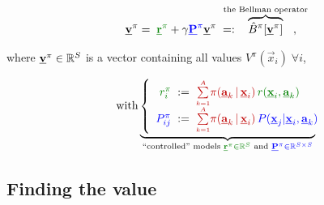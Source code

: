 \begin{frame}
	
	
\end{frame}

\begin{frame}

	
	\begin{equation}
		\vec v^\pi
		= \; {\color{reward}\vec r^\pi} 
			+ \gamma {\color{trans}\vec P^\pi} \vec v^\pi \; =: \kern-3ex\overbrace{\hat B^\pi[\vec v^\pi]}^{\text{the Bellman operator}}\kern-3ex,
	\end{equation}
	
	where $\underline{\mathbf{v}}^\pi \in \mathbb{R}^S$ is a vector containing all values $V^\pi(\vec x_{i})\;\forall i$,
	
	\begin{align}
		\quad \text{with}  \underbrace{ \left\{ \begin{array}{rcl} 
				{\color{reward}r^\pi_i} &\kern-1ex:=\kern-1ex& 
					{\color{policy} \smallsum{k=1}{A} 
					\pi(\vec a_k \,|\, \vec x_i)} \, 
					{\color{reward} r(\vec x_i, \vec a_k)} \\
				{\color{trans}P^\pi_{ij}} &\kern-1ex:=\kern-1ex& 
					{\color{policy}\smallsum{k=1}{A} 
					\pi(\vec a_k \,|\, \vec x_i)} \, 
					{\color{trans}P(\vec x_j | \vec x_i, \vec a_k)} \\
			\end{array} 
			\right.\kern-2ex}_{
				\text{``controlled'' models }
				{\color{reward}\vec r^\pi \in \R^S}
				\text{ and }{\color{trans}\vec P^\pi \in \R^{S \times S}}
			}
	\end{align}
	
\end{frame}

\subsection{Finding the value}

